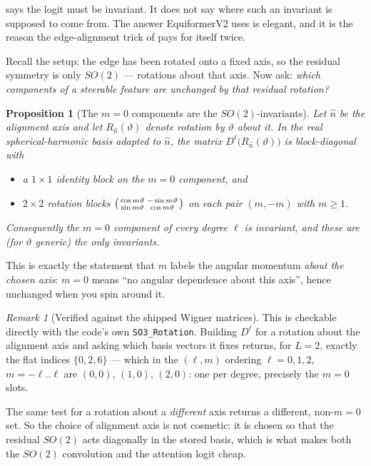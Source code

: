 \documentclass[11pt,a4paper]{report}
\newtheorem{proposition}[proposition]{Proposition}
\theoremstyle{definition}
\theoremstyle{remark}
\newtheorem{remark}[remark]{Remark}
\newcommand{\pyfunc}[1]{\texttt{#1}}
\begin{document}
 says the logit must be invariant. It
does not say where such an invariant is supposed to come from. The answer
EquiformerV2 uses is elegant, and it is the reason the edge-alignment trick
of  pays for itself twice.

Recall the setup: the edge has been rotated onto a fixed axis, so the
residual symmetry is only $SO(2)$ --- rotations about that axis. Now ask:
\emph{which components of a steerable feature are unchanged by that residual
rotation?}

\begin{proposition}[The $m=0$ components are the $SO(2)$-invariants]
\label{prop:m0-invariant}
Let $\hat n$ be the alignment axis and let $R_{\hat n}(\vartheta)$ denote
rotation by $\vartheta$ about it. In the real spherical-harmonic basis
adapted to $\hat n$, the matrix $D^\ell\bigl(R_{\hat n}(\vartheta)\bigr)$ is
block-diagonal with
\begin{itemize}[nosep]
\item a $1\times1$ identity block on the $m=0$ component, and
\item $2\times2$ rotation blocks
$\begin{psmallmatrix}\cos m\vartheta&-\sin m\vartheta\\ \sin m\vartheta&\cos m\vartheta\end{psmallmatrix}$
on each pair $(m,-m)$ with $m\ge1$.
\end{itemize}
Consequently the $m=0$ component of every degree $\ell$ is invariant, and
these are (for $\vartheta$ generic) the only invariants.
\end{proposition}

This is exactly the statement that $m$ labels the angular momentum
\emph{about the chosen axis}: $m=0$ means ``no angular dependence about this
axis'', hence unchanged when you spin around it.

\begin{remark}[Verified against the shipped Wigner matrices]
\label{rem:m0-verified}
This is checkable directly with the code's own
\pyfunc{SO3\_Rotation}. Building $D^\ell$ for a rotation about the
alignment axis and asking which basis vectors it fixes returns, for
$L=2$, exactly the flat indices $\{0,2,6\}$ --- which in the
$(\ell,m)$ ordering $\ell=0,1,2$, $m=-\ell..\ell$ are
$(0,0)$, $(1,0)$, $(2,0)$: one per degree, precisely the $m=0$ slots.

The same test for a rotation about a \emph{different} axis returns a
different, non-$m{=}0$ set. So the choice of alignment axis is not
cosmetic: it is chosen so that the residual $SO(2)$ acts diagonally in the
stored basis, which is what makes both the $SO(2)$ convolution and the
attention logit cheap.
\end{remark}
\end{document}
